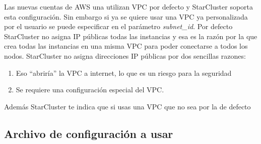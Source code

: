 \documentclass{article}
\begin{document}
	Las nuevas cuentas de AWS una utilizan VPC por defecto y  StarCluster soporta esta configuración. Sin embargo si ya se quiere usar una VPC ya personalizada por el usuario se puede especificar en el parámetro \emph{subnet\_id}. Por defecto StarCluster no asigna IP públicas todas las instancias y esa es la razón por la que crea todas las instancias en una misma VPC para poder conectarse a todos los nodos. StarCluster no asigna direcciones IP públicas por dos sencillas razones:
\begin{enumerate}
	\item Eso ``abriría'' la VPC a internet, lo que es un riesgo para la seguridad
	\item Se requiere una configuración especial del VPC.
\end{enumerate} 
	Además StarCluster te indica que si usas una VPC que no sea por la de defecto

\subsection{Archivo de configuración a usar}
\end{document}
